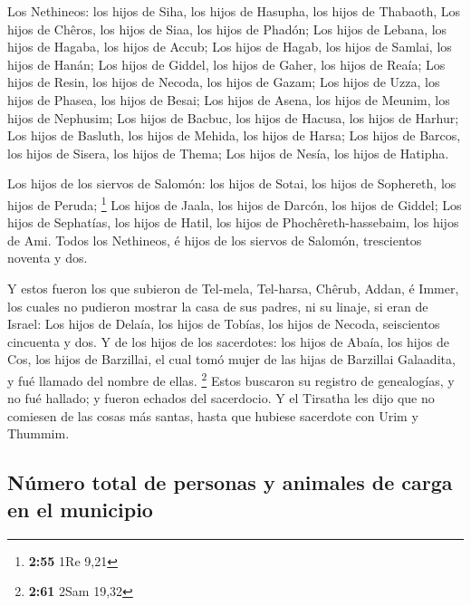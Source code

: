  Los Nethineos: los hijos de Siha, los hijos de Hasupha,
los hijos de Thabaoth,  Los hijos de Chêros, los hijos de
Siaa, los hijos de Phadón;  Los hijos de Lebana, los
hijos de Hagaba, los hijos de Accub;  Los hijos de Hagab,
los hijos de Samlai, los hijos de Hanán;  Los hijos de
Giddel, los hijos de Gaher, los hijos de Reaía;  Los
hijos de Resin, los hijos de Necoda, los hijos de Gazam; 
Los hijos de Uzza, los hijos de Phasea, los hijos de Besai;
 Los hijos de Asena, los hijos de Meunim, los hijos de
Nephusim;  Los hijos de Bacbuc, los hijos de Hacusa, los
hijos de Harhur;  Los hijos de Basluth, los hijos de
Mehida, los hijos de Harsa;  Los hijos de Barcos, los
hijos de Sisera, los hijos de Thema;  Los hijos de Nesía,
los hijos de Hatipha.

 Los hijos de los siervos de Salomón: los hijos de Sotai,
los hijos de Sophereth, los hijos de Peruda; \footnote{\textbf{2:55} 1Re
  9,21}  Los hijos de Jaala, los hijos de Darcón, los
hijos de Giddel;  Los hijos de Sephatías, los hijos de
Hatil, los hijos de Phochêreth-hassebaim, los hijos de Ami.
 Todos los Nethineos, é hijos de los siervos de Salomón,
trescientos noventa y dos.

 Y estos fueron los que subieron de Tel-mela, Tel-harsa,
Chêrub, Addan, é Immer, los cuales no pudieron mostrar la casa de sus
padres, ni su linaje, si eran de Israel:  Los hijos de
Delaía, los hijos de Tobías, los hijos de Necoda, seiscientos cincuenta
y dos.  Y de los hijos de los sacerdotes: los hijos de
Abaía, los hijos de Cos, los hijos de Barzillai, el cual tomó mujer de
las hijas de Barzillai Galaadita, y fué llamado del nombre de ellas.
\footnote{\textbf{2:61} 2Sam 19,32}  Estos buscaron su
registro de genealogías, y no fué hallado; y fueron echados del
sacerdocio.  Y el Tirsatha les dijo que no comiesen de
las cosas más santas, hasta que hubiese sacerdote con Urim y Thummim.

\hypertarget{nuxfamero-total-de-personas-y-animales-de-carga-en-el-municipio}{%
\subsection{Número total de personas y animales de carga en el
municipio}\label{nuxfamero-total-de-personas-y-animales-de-carga-en-el-municipio}}

